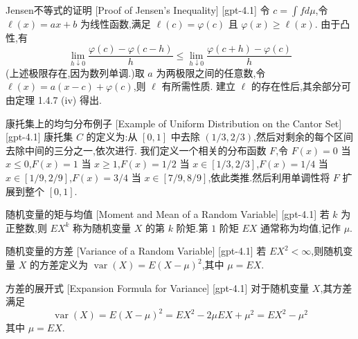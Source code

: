 \documentclass[UTF8]{ctexart}
\begin{document}
    
    
    \begin{prf}
        {Jensen不等式的证明}
        [Proof of Jensen's Inequality]
        [gpt-4.1]
        令 $c = \int f d\mu$,令 $\ell(x) = a x + b$ 为线性函数,满足 $\ell(c) = \varphi(c)$ 且 $\varphi(x) \geq \ell(x)$.
由于凸性,有
\[
\lim_{h \downarrow 0} \frac{\varphi(c) - \varphi(c-h)}{h} \leq \lim_{h \downarrow 0} \frac{\varphi(c+h) - \varphi(c)}{h}
\]
(上述极限存在,因为数列单调.)取 $a$ 为两极限之间的任意数,令 $\ell(x) = a(x-c) + \varphi(c)$,则 $\ell$ 有所需性质.
建立 $\ell$ 的存在性后,其余部分可由定理 1.4.7 (iv) 得出.

    \end{prf}
    
    
    
    \begin{xmp}
        {康托集上的均匀分布例子}
        [Example of Uniform Distribution on the Cantor Set]
        [gpt-4.1]
        康托集 $C$ 的定义为:从 $[0,1]$ 中去除 $(1/3, 2/3)$,然后对剩余的每个区间去除中间的三分之一,依次进行.
我们定义一个相关的分布函数 $F$,令 $F(x) = 0$ 当 $x \leq 0$,$F(x) = 1$ 当 $x \geq 1$,$F(x) = 1/2$ 当 $x \in [1/3, 2/3]$,$F(x) = 1/4$ 当 $x \in [1/9, 2/9]$,$F(x) = 3/4$ 当 $x \in [7/9, 8/9]$,依此类推.然后利用单调性将 $F$ 扩展到整个 $[0,1]$.

    \end{xmp}
    
    
    
    \begin{dfn}
        {随机变量的矩与均值}
        [Moment and Mean of a Random Variable]
        [gpt-4.1]
        若 $k$ 为正整数,则 $E X^{k}$ 称为随机变量 $X$ 的第 $k$ 阶矩.第 $1$ 阶矩 $E X$ 通常称为均值,记作 $\mu$.
    \end{dfn}
    
    
    
    \begin{dfn}
        {随机变量的方差}
        [Variance of a Random Variable]
        [gpt-4.1]
        若 $E X^{2} < \infty$,则随机变量 $X$ 的方差定义为 $\operatorname{var}( X ) = E ( X - \mu )^{2}$,其中 $\mu = E X$.
    \end{dfn}
    
    
    
    \begin{ppt}
        {方差的展开式}
        [Expansion Formula for Variance]
        [gpt-4.1]
        对于随机变量 $X$,其方差满足
\[
\operatorname{var}( X ) = E ( X - \mu )^{2} = E X^{2} - 2 \mu E X + \mu^{2} = E X^{2} - \mu^{2}
\]
其中 $\mu = E X$.
    \end{ppt}
    
\end{document}
